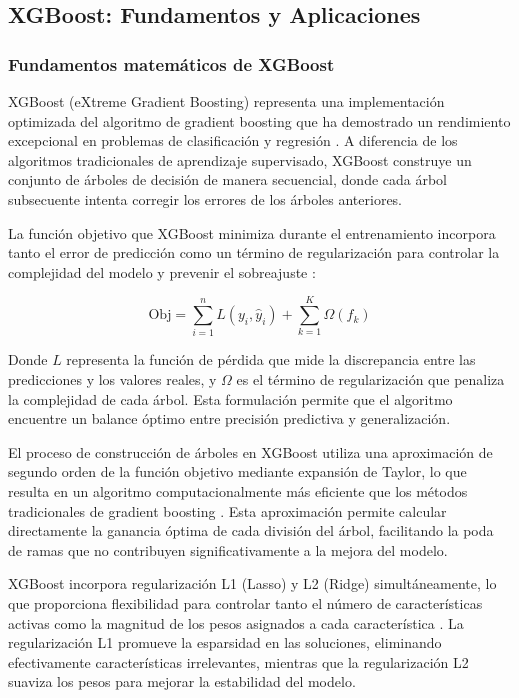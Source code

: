 \subsection{XGBoost: Fundamentos y Aplicaciones}

\subsubsection{Fundamentos matemáticos de XGBoost}
XGBoost (eXtreme Gradient Boosting) representa una implementación optimizada del algoritmo de gradient boosting que ha demostrado un rendimiento excepcional en problemas de clasificación y regresión \citep{chen2016xgboost}. A diferencia de los algoritmos tradicionales de aprendizaje supervisado, XGBoost construye un conjunto de árboles de decisión de manera secuencial, donde cada árbol subsecuente intenta corregir los errores de los árboles anteriores.

La función objetivo que XGBoost minimiza durante el entrenamiento incorpora tanto el error de predicción como un término de regularización para controlar la complejidad del modelo y prevenir el sobreajuste \citep{chen2016xgboost}:

\begin{equation}
\text{Obj} = \sum_{i=1}^{n} L(y_i, \hat{y}_i) + \sum_{k=1}^{K} \Omega(f_k)
\end{equation}

Donde $L$ representa la función de pérdida que mide la discrepancia entre las predicciones y los valores reales, y $\Omega$ es el término de regularización que penaliza la complejidad de cada árbol. Esta formulación permite que el algoritmo encuentre un balance óptimo entre precisión predictiva y generalización.

El proceso de construcción de árboles en XGBoost utiliza una aproximación de segundo orden de la función objetivo mediante expansión de Taylor, lo que resulta en un algoritmo computacionalmente más eficiente que los métodos tradicionales de gradient boosting \citep{friedman2001greedy}. Esta aproximación permite calcular directamente la ganancia óptima de cada división del árbol, facilitando la poda de ramas que no contribuyen significativamente a la mejora del modelo.

XGBoost incorpora regularización L1 (Lasso) y L2 (Ridge) simultáneamente, lo que proporciona flexibilidad para controlar tanto el número de características activas como la magnitud de los pesos asignados a cada característica \citep{friedman2001greedy}. La regularización L1 promueve la esparsidad en las soluciones, eliminando efectivamente características irrelevantes, mientras que la regularización L2 suaviza los pesos para mejorar la estabilidad del modelo.

